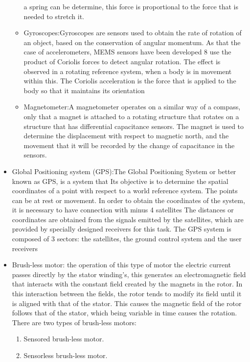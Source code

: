 \begin{itemize}
\begin{itemize}
a spring can be determine, this force is  proportional to the force that is needed to stretch it\cite{JD}.
\item Gyroscopes:Gyroscopes are sensors used to obtain the rate of
rotation of an object, based on the conservation of angular momentum. As
that the case of accelerometers, MEMS sensors have been developed 8 use the product of Coriolis forces to detect angular rotation. The effect is observed in a rotating reference system, when a body is in
movement within this. The Coriolis acceleration is the force that is applied to the body so that it maintains its orientation \cite{gyro}
\item Magnetometer:A magnetometer operates on a similar way of a compass,
only that a magnet is attached to a rotating structure that rotates on a structure that has differential capacitance sensors. The magnet is used to
determine the displacement with respect to magnetic north, and the movement that
it will be recorded by the change of capacitance in the sensors.\cite{gyro}
\end{itemize}
\item Global Positioning system (GPS):The Global Positioning System or better known as GPS, is a system that
Its objective is to determine the spatial coordinates of a point with respect to a
world reference system. The points can be at rest or movement.
In order to obtain the coordinates of the system, it is necessary to have connection with
minus 4 satellites The distances or coordinates are obtained from the signals emitted by the
satellites, which are provided by specially designed receivers for this task.
The GPS system is composed of 3 sectors: the satellites, the ground control system
and the user receivers\cite{GPS}
\item Brush-less motor: the operation of this type of motor the electric current passes directly
by the stator winding's, this generates an electromagnetic field that interacts with
the constant field created by the magnets in the rotor. In this interaction between the fields,
the rotor tends to modify its field until it is aligned with that of the stator. This causes
the magnetic field of the rotor follows that of the stator, which being variable in time causes the
rotation.\cite{Perez}
There are two types of brush-less motors:\begin{enumerate}
\item Sensored brush-less motor.
\item Sensorless brush-less motor.
\end{enumerate}
\end{itemize}
